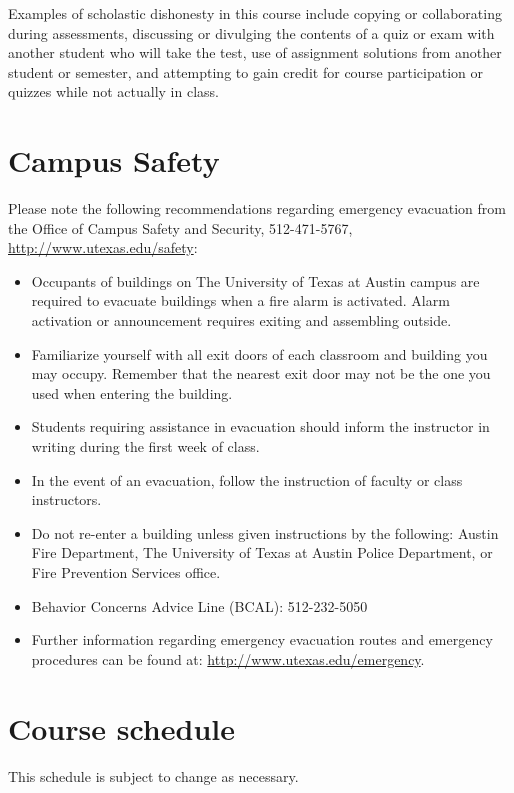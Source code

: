 \documentclass[12pt]{article}
\begin{document}
Examples of scholastic dishonesty in this course include copying or collaborating during assessments, discussing or divulging the contents of a quiz or exam with another student who will take the test, use of assignment solutions from another student or semester, and attempting to gain credit for course participation or quizzes while not actually in class.

\section*{Campus Safety}
Please note the following recommendations regarding emergency evacuation from the Office of Campus Safety and Security, 512-471-5767, \url{http://www.utexas.edu/safety}:
\begin{itemize}
\item   Occupants of buildings on The University of Texas at Austin campus are required to evacuate buildings when a fire alarm is activated.  Alarm activation or announcement requires exiting and assembling outside.
\item   Familiarize yourself with all exit doors of each classroom and building you may occupy.  Remember that the nearest exit door may not be the one you used when entering the building.
\item   Students requiring assistance in evacuation should inform the instructor in writing during the first week of class.
\item   In the event of an evacuation, follow the instruction of faculty or class instructors.
\item   Do not re-enter a building unless given instructions by the following: Austin Fire Department, The University of Texas at Austin Police Department, or Fire Prevention Services office.
\item   Behavior Concerns Advice Line (BCAL):  512-232-5050
\item   Further information regarding emergency evacuation routes and emergency procedures can be found at: \url{http://www.utexas.edu/emergency}.
\end{itemize}

\section*{Course schedule}
This schedule is subject to change as necessary.
\end{document}
